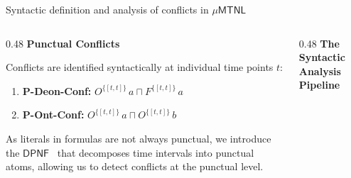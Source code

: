 \documentclass[9pt,aspectratio=169]{beamer}
\newcommand{\logic}[1]{\ensuremath{\mathsf{#1}}\xspace}
\newcommand{\TDDLfm}{\logic{\mu MTNL}}
\newcommand{\dpnf}{\ensuremath{\mathsf{DPNF}}}
\newcommand{\pnf}{\ensuremath{\mathsf{PNF}}}
\newcommand{\ob}[2]{\ensuremath{O^{#1}\,#2}}
\newcommand{\forbb}[2]{\ensuremath{F^{#1}\,#2}}
\begin{document}

\begin{frame}{Syntactic definition and analysis of conflicts in $\TDDLfm$ }
\small
\begin{columns}[T]
\begin{column}{0.48\textwidth}
  \textbf{Punctual Conflicts}
  \medskip

  Conflicts are identified syntactically at individual time points $t$:
  \begin{enumerate}
    \item \textbf{P-Deon-Conf:}
    $ \ob{\{[t,t]\}}{a} \sqcap \forbb{\{[t,t]\}}{a} $
    \item \textbf{P-Ont-Conf:}
    $ \ob{\{[t,t]\}}{a} \sqcap \ob{\{[t,t]\}}{b} $
  \end{enumerate}
  \vspace{2mm}
  \vspace{1mm}
 As literals in formulas are not always punctual, we introduce the \dpnf~  that decomposes time intervals into punctual atoms, allowing us to detect conflicts at the punctual level.
\end{column}

\begin{column}{0.48\textwidth}
  \textbf{The Syntactic Analysis Pipeline}
  
  \vspace{2mm}
  \begin{center}
\end{center}
\end{column}
\end{columns}
\end{frame}
\end{document}
